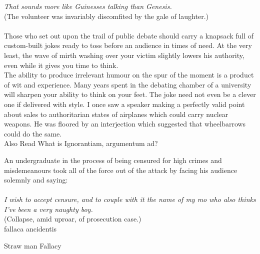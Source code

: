 \documentclass[a4paper,12pt,single,pdftex]{scrartcl}
\begin{document}
    
      {\em That sounds more like Guinesses talking than Genesis.}
    \\

    
      (The volunteer was invariably discomfited by the gale of laughter.)
    \\

    
       
    \\

    
      Those who set out upon the trail of public debate should carry a knapsack full of custom-built jokes ready to toss before an audience in times of need. At the very least, the wave of mirth washing over your victim slightly lowers his authority, even while it gives you time to think.
    \\

    
      The ability to produce irrelevant humour on the spur of the moment is a product of wit and experience. Many years spent in the debating chamber of a university will sharpen your ability to think on your feet. The joke need not even be a clever one if delivered with style. I once saw a speaker making a perfectly valid point about sales to authoritarian states of airplanes which could carry nuclear weapons. He was floored by an interjection which suggested that wheelbarrows could do the same.
    \\

    
      

      
        Also Read  What is Ignorantiam, argumentum ad?
      
    
    
      An undergraduate in the process of being censured for high crimes and misdemeanours took all of the force out of the attack by facing his audience solemnly and saying:
    \\

    
       
    \\

    
      {\em I wish to accept censure, and to couple with it the name of my mo who also thinks I’ve been a very naughty boy.}
    \\

    
      (Collapse, amid uproar, of prosecution case.)
    \\

  

fallaca ancidentis

Straw man Fallacy
    
\end{document}
